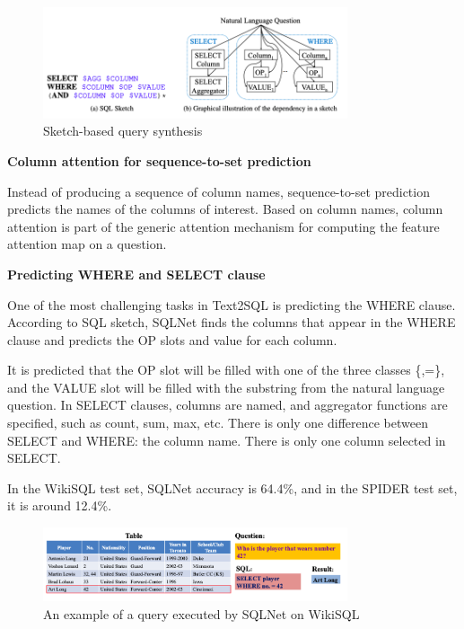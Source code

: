 \begin{figure}[htb]
    \centering
    \includegraphics[width=0.8\textwidth]{pics/sqlnet/sketch-based.png}
    \caption{Sketch-based query synthesis}
    \label{fig:sketch-based}
\end{figure}

\textbf{Column attention for sequence-to-set prediction}

Instead of producing a sequence of column names, sequence-to-set prediction predicts the names of the columns of interest.
Based on column names, column attention is part of the generic attention mechanism for computing the feature attention map on a question.

\textbf{Predicting WHERE and SELECT clause}

One of the most challenging tasks in Text2SQL is predicting the WHERE clause.
According to SQL sketch, SQLNet finds the columns that appear in the WHERE clause and predicts the OP slots and value for each column.

It is predicted that the OP slot will be filled with one of the three classes \{<,>,=\}, and the VALUE slot will be filled with the substring from the natural language question.
In SELECT clauses, columns are named, and aggregator functions are specified, such as count, sum, max, etc. There is only one difference between SELECT and WHERE: the column name. There is only one column selected in SELECT.

In the WikiSQL test set, SQLNet accuracy is 64.4\%, and in the SPIDER test set, it is around 12.4\%.

\begin{figure}[htb]
    \centering
    \includegraphics[width=0.8\textwidth]{pics/sqlnet/sqlnet-task.png}
    \caption{An example of a query executed by SQLNet on WikiSQL}
    \label{fig:sqlnet-task}
\end{figure}